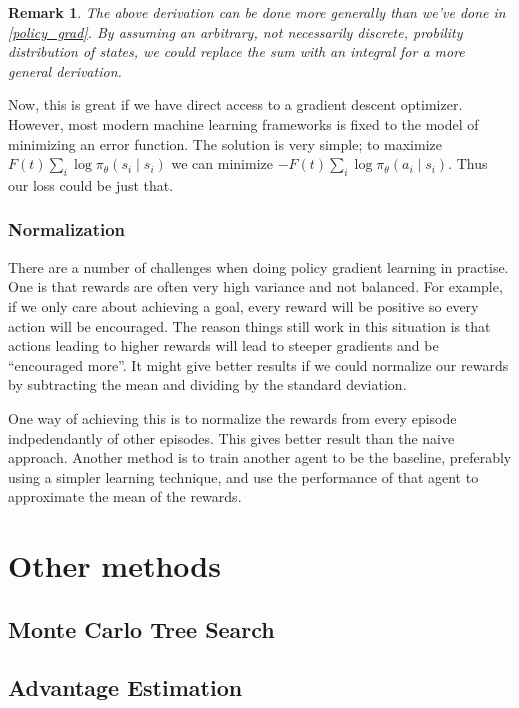 \documentclass{article}
\theoremstyle{changedot}
\theoremstyle{changedotbreak}
\theoremstyle{nonumberplain}
\newtheorem{remark}{Remark}
\begin{document}
\begin{remark}
  The above derivation can be done more generally than we've done in \ref{policy_grad}. By assuming an arbitrary, not necessarily discrete, probility distribution of states, we could replace the sum with an integral for a more general derivation.
\end{remark}

Now, this is great if we have direct access to a gradient descent optimizer. However, most modern machine learning frameworks is fixed to the model of minimizing an error function. The solution is very simple; to maximize $F(t) \sum_{i} \log \pi_{\theta} (s_{i} \mid s_{i})$ we can minimize $-F(t) \sum_{i} \log \pi_{\theta} (a_{i} \mid s_{i})$. Thus our loss could be just that.

\subsubsection{Normalization}
There are a number of challenges when doing policy gradient learning in practise. One is that rewards are often very high variance and not balanced. For example, if we only care about achieving a goal, every reward will be positive so every action will be encouraged. The reason things still work in this situation is that actions leading to higher rewards will lead to steeper gradients and be ``encouraged more''. It might give better results if we could normalize our rewards by subtracting the mean and dividing by the standard deviation.

One way of achieving this is to normalize the rewards from every episode indpedendantly of other episodes. This gives better result than the naive approach. Another method is to train another agent to be the baseline, preferably using a simpler learning technique, and use the performance of that agent to approximate the mean of the rewards.


\section{Other methods}

\subsection{Monte Carlo Tree Search}

\subsection{Advantage Estimation}




\end{document}
